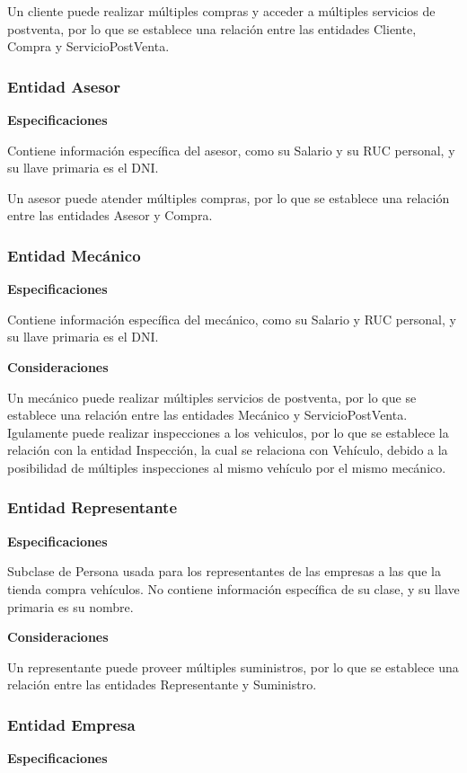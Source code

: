 \documentclass[12pt]{article}
\begin{document}
Un cliente puede realizar múltiples compras y acceder a múltiples servicios de postventa, por lo que se establece una relación entre las entidades Cliente, Compra y ServicioPostVenta.

\subsubsection{Entidad Asesor}
\textbf{Especificaciones}

Contiene información específica del asesor, como su Salario y su RUC personal, y su llave primaria es el DNI.

Un asesor puede atender múltiples compras, por lo que se establece una relación entre las entidades Asesor y Compra. 

\subsubsection{Entidad Mecánico}
\textbf{Especificaciones}

Contiene información específica del mecánico, como su Salario y RUC personal, y su llave primaria es el DNI.

\textbf{Consideraciones}

Un mecánico puede realizar múltiples servicios de postventa, por lo que se establece una relación entre las entidades Mecánico y ServicioPostVenta. Igulamente puede realizar inspecciones a los vehiculos, por lo que se establece la relación con la entidad Inspección, la cual se relaciona con Vehículo, debido a la posibilidad de múltiples inspecciones al mismo vehículo por el mismo mecánico.

\subsubsection{Entidad Representante}
\textbf{Especificaciones}

Subclase de Persona usada para los representantes de las empresas a las que la tienda compra vehículos. No contiene información específica de su clase, y su llave primaria es su nombre.

\textbf{Consideraciones}

Un representante puede proveer múltiples suministros, por lo que se establece una relación entre las entidades Representante y Suministro.

\subsubsection{Entidad Empresa}
\textbf{Especificaciones}
\end{document}
